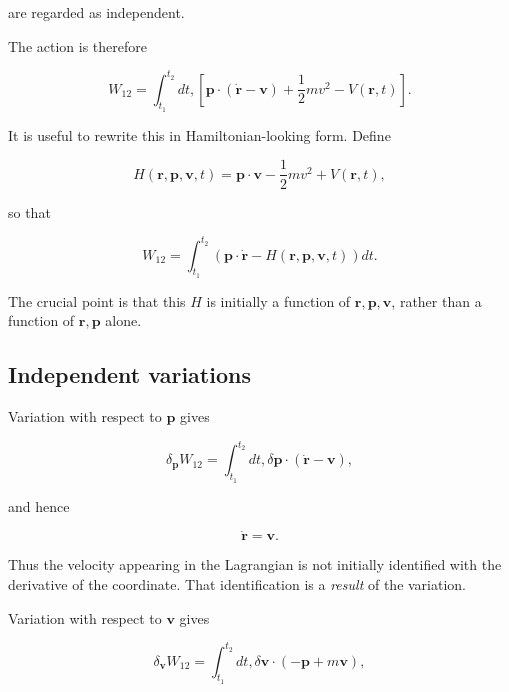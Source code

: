 are regarded as independent.

The action is therefore

\begin{equation}
W_{12}=
\int_{t_1}^{t_2}
dt,
\left[
\mathbf p\cdot(\dot{\mathbf r}-\mathbf v)
+\frac12m v^2
-V(\mathbf r,t)
\right].
\label{eq:SchwingerAction}
\end{equation}

It is useful to rewrite this in Hamiltonian-looking form. Define

\begin{equation}
H(\mathbf r,\mathbf p,\mathbf v,t)=
\mathbf p\cdot\mathbf v
-\frac12m v^2
+V(\mathbf r,t),
\label{eq:SchwingerH}
\end{equation}

so that

\begin{equation}
W_{12}=
\int_{t_1}^{t_2}
\left(
\mathbf p\cdot\dot{\mathbf r}
-H(\mathbf r,\mathbf p,\mathbf v,t)
\right)dt .
\label{eq:SchwingerPhaseAction}
\end{equation}

The crucial point is that this \(H\) is initially a function of
\(\mathbf r,\mathbf p,\mathbf v\), rather than a function of
\(\mathbf r,\mathbf p\) alone.

\subsection{Independent variations}

Variation with respect to \(\mathbf p\) gives

\begin{equation}
\delta_{\mathbf p}W_{12}=
\int_{t_1}^{t_2}
dt,
\delta\mathbf p\cdot
(\dot{\mathbf r}-\mathbf v),
\end{equation}

and hence

\begin{equation}
\boxed{\dot{\mathbf r}=\mathbf v}.
\label{eq:SchwingerVelocity}
\end{equation}

Thus the velocity appearing in the Lagrangian is not initially identified with the derivative of the coordinate. That identification is a \emph{result} of the variation.

Variation with respect to \(\mathbf v\) gives

\begin{equation}
\delta_{\mathbf v}W_{12}=
\int_{t_1}^{t_2}
dt,
\delta\mathbf v\cdot
(-\mathbf p+m\mathbf v),
\end{equation}

